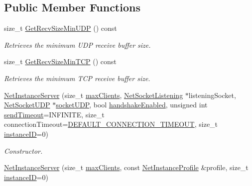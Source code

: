 \subsection*{Public Member Functions}
\begin{DoxyCompactItemize}
\item 
size\_\-t \hyperlink{class_net_instance_server_a9763425c0e0489e4eea07b72ea1e7fc2}{GetRecvSizeMinUDP} () const 
\begin{DoxyCompactList}\small\item\em Retrieves the minimum UDP receive buffer size. \item\end{DoxyCompactList}\item 
size\_\-t \hyperlink{class_net_instance_server_a6c809f671ccc29e9c688545ac12eb0fc}{GetRecvSizeMinTCP} () const 
\begin{DoxyCompactList}\small\item\em Retrieves the minimum TCP receive buffer size. \item\end{DoxyCompactList}\item 
\hyperlink{class_net_instance_server_a39f8de86af491972f0c99c82dc9f9772}{NetInstanceServer} (size\_\-t \hyperlink{class_net_instance_server_ae08f9f216c652168e54dc0f86dff2416}{maxClients}, \hyperlink{class_net_socket_listening}{NetSocketListening} $\ast$listeningSocket, \hyperlink{class_net_socket_u_d_p}{NetSocketUDP} $\ast$\hyperlink{class_net_instance_u_d_p_af86e8343ddf2daf0ce3f9ea701bc7cf3}{socketUDP}, bool \hyperlink{class_net_instance_t_c_p_af13f96901d3006beeda0c161f32cbfde}{handshakeEnabled}, unsigned int \hyperlink{class_net_instance_a39ed2f4325ce50a7c374ab6253650608}{sendTimeout}=INFINITE, size\_\-t connectionTimeout=\hyperlink{class_net_instance_server_ace7e83c6a82f0810cee2c7c638bb9397}{DEFAULT\_\-CONNECTION\_\-TIMEOUT}, size\_\-t \hyperlink{class_net_instance_a46bab6fc672f987ee3c52daabffe34f7}{instanceID}=0)
\begin{DoxyCompactList}\small\item\em Constructor. \item\end{DoxyCompactList}\item 
\hyperlink{class_net_instance_server_ad339320c92e5ea5ab9b0b6f572db30ee}{NetInstanceServer} (size\_\-t \hyperlink{class_net_instance_server_ae08f9f216c652168e54dc0f86dff2416}{maxClients}, const \hyperlink{class_net_instance_profile}{NetInstanceProfile} \&profile, size\_\-t \hyperlink{class_net_instance_a46bab6fc672f987ee3c52daabffe34f7}{instanceID}=0)

\end{DoxyCompactItemize}
